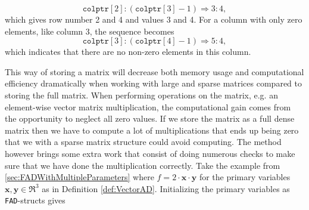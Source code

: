 \begin{equation*}
    \texttt{colptr}[2]:(\texttt{colptr}[3]-1) \Longrightarrow 3:4,
\end{equation*}
which gives row number 2 and 4 and values 3 and 4. For a column with only zero elements, like column 3, the sequence becomes
\begin{equation*}
    \texttt{colptr}[3]:(\texttt{colptr}[4]-1)\Longrightarrow 5:4,
\end{equation*}
which indicates that there are no non-zero elements in this column. 

This way of storing a matrix will decrease both memory usage and computational efficiency dramatically when working with large and sparse matrices compared to storing the full matrix. When performing operations on the matrix, e.g. an element-wise vector matrix  multiplication, the computational gain comes from the opportunity to neglect all zero values. If we store the matrix as a full dense matrix then we have to compute a lot of multiplications that ends up being zero that we with a sparse matrix structure could avoid computing. The method however brings some extra work that consist of doing numerous checks to make sure that we have done the multiplication correctly. Take the example from \autoref{sec:FADWithMultipleParameters} where $f = 2\cdot \textbf{x}\cdot \textbf{y}$ for the primary variables $\textbf{x},\textbf{y}\in \Re^3$ as in Definition \eqref{def:VectorAD}. Initializing the primary variables as \texttt{FAD}-structs gives 
